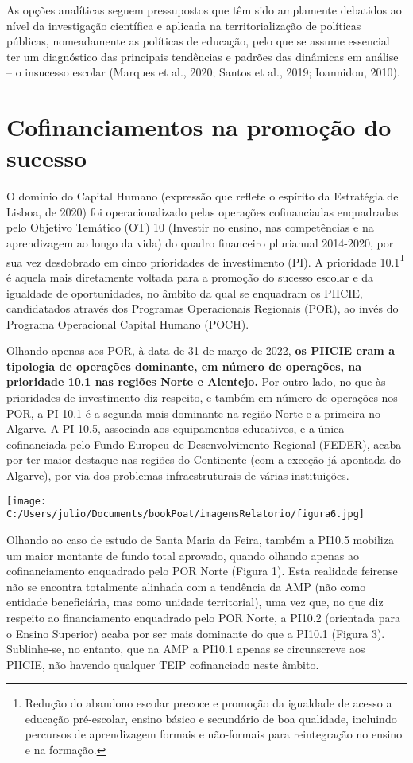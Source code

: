 \documentclass[
]{book}
\begin{document}
As opções analíticas seguem pressupostos que têm sido amplamente debatidos ao nível da investigação científica e aplicada na territorialização de políticas públicas, nomeadamente as políticas de educação, pelo que se assume essencial ter um diagnóstico das principais tendências e padrões das dinâmicas em análise -- o insucesso escolar (Marques et al., 2020; Santos et al., 2019; Ioannidou, 2010).

\hypertarget{cofinanciamentos-na-promouxe7uxe3o-do-sucesso}{%
\section{Cofinanciamentos na promoção do sucesso}\label{cofinanciamentos-na-promouxe7uxe3o-do-sucesso}}

O domínio do Capital Humano (expressão que reflete o espírito da Estratégia de Lisboa, de 2020) foi operacionalizado pelas operações cofinanciadas enquadradas pelo Objetivo Temático (OT) 10 (Investir no ensino, nas competências e na aprendizagem ao longo da vida) do quadro financeiro plurianual 2014-2020, por sua vez desdobrado em cinco prioridades de investimento (PI). A prioridade 10.1\footnote{Redução do abandono escolar precoce e promoção da igualdade de acesso a educação pré-escolar, ensino básico e secundário de boa qualidade, incluindo percursos de aprendizagem formais e não-formais para reintegração no ensino e na formação.} é aquela mais diretamente voltada para a promoção do sucesso escolar e da igualdade de oportunidades, no âmbito da qual se enquadram os PIICIE, candidatados através dos Programas Operacionais Regionais (POR), ao invés do Programa Operacional Capital Humano (POCH).

Olhando apenas aos POR, à data de 31 de março de 2022, \textbf{os PIICIE eram a tipologia de operações dominante, em número de operações, na prioridade 10.1 nas regiões Norte e Alentejo.} Por outro lado, no que às prioridades de investimento diz respeito, e também em número de operações nos POR, a PI 10.1 é a segunda mais dominante na região Norte e a primeira no Algarve. A PI 10.5, associada aos equipamentos educativos, e a única cofinanciada pelo Fundo Europeu de Desenvolvimento Regional (FEDER), acaba por ter maior destaque nas regiões do Continente (com a exceção já apontada do Algarve), por via dos problemas infraestruturais de várias instituições.

\texttt{[image: C:/Users/julio/Documents/bookPoat/imagensRelatorio/figura6.jpg]}

Olhando ao caso de estudo de Santa Maria da Feira, também a PI10.5 mobiliza um maior montante de fundo total aprovado, quando olhando apenas ao cofinanciamento enquadrado pelo POR Norte (Figura 1). Esta realidade feirense não se encontra totalmente alinhada com a tendência da AMP (não como entidade beneficiária, mas como unidade territorial), uma vez que, no que diz respeito ao financiamento enquadrado pelo POR Norte, a PI10.2 (orientada para o Ensino Superior) acaba por ser mais dominante do que a PI10.1 (Figura 3). Sublinhe-se, no entanto, que na AMP a PI10.1 apenas se circunscreve aos PIICIE, não havendo qualquer TEIP cofinanciado neste âmbito.
\end{document}
